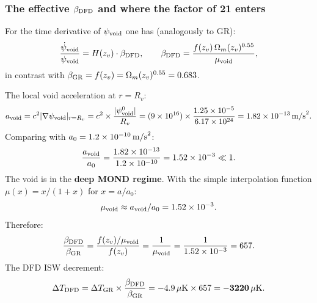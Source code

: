 \documentclass[11pt]{article}
\newcommand{\ee}[1]{\times 10^{#1}}
\newcommand{\mufd}{\mu}
\newcommand{\DFD}{{\rm DFD}}
\newcommand{\GR}{{\rm GR}}
\newcommand{\deltaT}{\Delta T}
\begin{document}
\subsubsection{The effective $\beta_{\DFD}$ and where the factor of 21 enters}

For the time derivative of $\psi_{\rm void}$ one has (analogously to GR):
\begin{equation}\label{eq:beta-dfd}
  \frac{\dot\psi_{\rm void}}{\psi_{\rm void}} = H(z_v)\cdot\beta_{\DFD},
  \qquad
  \beta_{\DFD} = \frac{f(z_v)\,\Omega_m(z_v)^{0.55}}{\mufd_{\rm void}},
\end{equation}
in contrast with $\beta_{\GR} = f(z_v) = \Omega_m(z_v)^{0.55} = 0.683$.

The local void acceleration at $r = R_v$:
\begin{equation}
  a_{\rm void} = c^2|\nabla\psi_{\rm void}|_{r = R_v}
  = c^2\times\frac{|\psi_{\rm void}^0|}{R_v}
  = (9\ee{16})\times\frac{1.25\ee{-5}}{6.17\ee{24}}
  = 1.82\ee{-13}\,{\rm m/s}^2.
\end{equation}
Comparing with $a_0 = 1.2\ee{-10}\,{\rm m/s}^2$:
\begin{equation}
  \frac{a_{\rm void}}{a_0} = \frac{1.82\ee{-13}}{1.2\ee{-10}} = 1.52\ee{-3} \ll 1.
\end{equation}
The void is in the \textbf{deep MOND regime}.  With the simple
interpolation function $\mufd(x) = x/(1+x)$ for $x = a/a_0$:
\[
  \mufd_{\rm void} \approx a_{\rm void}/a_0 = 1.52\ee{-3}.
\]
Therefore:
\begin{equation}\label{eq:beta-ratio}
  \frac{\beta_{\DFD}}{\beta_{\GR}}
  = \frac{f(z_v)/\mufd_{\rm void}}{f(z_v)}
  = \frac{1}{\mufd_{\rm void}}
  = \frac{1}{1.52\ee{-3}} = 657.
\end{equation}
The DFD ISW decrement:
\begin{equation}
  \deltaT_{\DFD}
  = \deltaT_{\GR}\times\frac{\beta_{\DFD}}{\beta_{\GR}}
  = -4.9\,\mu{\rm K}\times 657 = \mathbf{-3220\,\mu{\rm K}}.
\end{equation}
\end{document}
